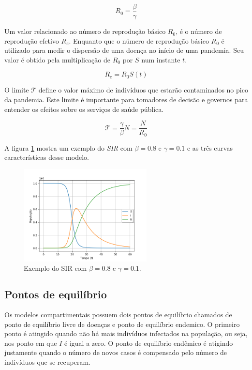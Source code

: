 \begin{equation}\label{eq:numero-reproducao-basico}
    R_0 = \frac{\beta}{\gamma}
\end{equation}

Um valor relacionado ao número de reprodução básico $R_0$, é o número de reprodução
efetivo $R_e$. Enquanto que o número de reprodução básico $R_0$ é utilizado para
medir o dispersão de uma doença no início de uma pandemia. 
Seu valor é obtido pela multiplicação de $R_0$ por $S$ num instante $t$.

\begin{equation}\label{eq:numero-reproducao-efetivo}
    R_e = R_0 S(t)
\end{equation}

O limite $\mathcal{T}$ define o valor máximo de indivíduos que estarão contaminados
no pico da pandemia. Este limite é importante para tomadores de decisão e governos
para entender os efeitos sobre os serviços de saúde pública.

\begin{equation}
    \mathcal{T} = \frac{\gamma}{\beta}N = \frac{N}{R_0}
\end{equation}

A figura \ref{fig:exemplo-sir} mostra um exemplo do \textit{SIR} com $\beta=0.8$
e $\gamma=0.1$ e as três curvas características desse modelo.

\begin{figure}[htpb]
\centering
\includegraphics[width=0.6\textwidth]{figuras/sir-example-beta0.8-gamma0.1.png}
\caption{Exemplo do SIR com $\beta=0.8$ e $\gamma=0.1$.}
\label{fig:exemplo-sir}
\end{figure}

\subsection{Pontos de equilíbrio}

Os modelos compartimentais possuem dois pontos de equilíbrio chamados de 
ponto de equilíbrio livre de doenças e ponto de equilíbrio endemico. 
O primeiro ponto é atingido quando não há mais indivíduos infectados na população,
ou seja, nos ponto em que $I$ é igual a zero. O ponto de equilíbrio endêmico
é atigindo justamente quando o número de novos casos é compensado pelo número
de indivíduos que se recuperam.

